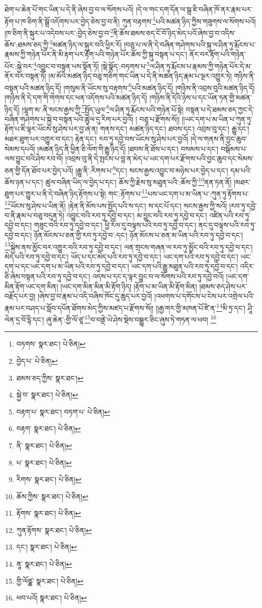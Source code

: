 ཐེག་པ་ཆེན་པོ་གང་ཡིན་པ་དེ་ནི་ཞེས་བྱ་བ་ལ་སོགས་པའོ། །དེ་ལ་གང་དག་དོན་ལ་སྒྲ་ཇི་བཞིན་ཁོ་ནར་རྣམ་པར་རྟོག་པ་ཁ་ཅིག་ནི་སྒྲོ་འདོགས་པར་བྱེད་ཅེས་བྱ་བ་ནི། ཀུན་བརྟགས་\footnote{བཏགས་  སྣར་ཐང་།  པེ་ཅིན། }པའི་མཚན་ཉིད་ཀྱིས་གཟུགས་ལ་སོགས་པའོ། །ཁ་ཅིག་ནི་སྐུར་པ་འདེབས་པར་:བྱེད་ཅེས་བྱ་བ་\footnote{བྱེད་པ་  པེ་ཅིན། }ནི་ཆོས་ཐམས་ཅད་ངོ་བོ་ཉིད་མེད་པའོ་ཞེས་བྱ་བ་འདིས་ཆོས་:ཐམས་ཅད་ཀྱི་\footnote{ཐམས་ཅད་ཀྱིས་  སྣར་ཐང་། }མཚན་ཉིད་ལ་སྐུར་བའི་ཕྱིར་རོ། །བཅུ་པ་ལ་ནི་དེ་བཞིན་གཤེགས་པའི་སྐུ་ལ་ཤིན་ཏུ་རྨོངས་པ་རྣམས་ཀྱི་གཉེན་པོར་ནི་མི་རྟག་པར་རྟོག་པའི་གཉེན་པོར་ཆོས་ཀྱི་སྐུ་བསྟན་པ་དང་། ནོར་བར་རྟོག་པའི་གཉེན་པོར་:སྐྱེ་བར་\footnote{སྐྱེ་བ་  སྣར་ཐང་།  པེ་ཅིན། }འབྱུང་བ་བསྟན་པས་སྟོན་ཏོ། །སྡེ་སྣོད་:བཏགས་པ་\footnote{བརྟག་པ་  སྣར་ཐང་། བཏག་པ་  པེ་ཅིན། }ལ་ཤིན་ཏུ་རྨོངས་པ་རྣམས་ཀྱི་གཉེན་པོར་དེ་མ་ནོར་བར་བསྟན་ཏོ། །མ་མོའི་མཚན་ཉིད་བཅུ་གཅིག་གང་ཡིན་པ་དེ་ནི་མཚན་ཉིད་རྣམ་པ་ལྔར་འགྱུར་ཏེ། གཉིས་ནི་བསྟན་པའི་མཚན་ཉིད་དོ། །གསུམ་ནི་ཡོངས་སུ་བརྟགས་\footnote{བརྟག་  སྣར་ཐང་།  པེ་ཅིན། }པའི་མཚན་ཉིད་དོ། །གཉིས་ནི་འབྲས་བུའི་མཚན་ཉིད་དོ། །གཉིས་ནི་དེ་དག་གི་གེགས་དང་ཕན་འདོགས་པའི་མཚན་ཉིད་དོ། །གཉིས་ནི་དེའི་ཉེས་པ་དང་ཡོན་ཏན་གྱི་མཚན་ཉིད་དོ། །ལྷག་མ་:ནི་སངས་རྒྱས་ཀྱི་\footnote{ནི་  སྣར་ཐང་།  པེ་ཅིན། }སྤྱོད་ཡུལ་\footnote{པ་  སྣར་ཐང་།  པེ་ཅིན། }ལ་ཤིན་ཏུ་རྨོངས་པའི་གཉེན་པོ་སྟེ། བསྟན་པ་དེ་ཐམས་ཅད་ཀྱང་དེ་བཞིན་གཤེགས་པ་སྐྱེ་བ་བསྟན་པའི་ཚུལ་དུ་རིག་པར་བྱའོ། །
བཅུ་པ་རྫོགས་སོ།། །།ཡང་དག་པ་མ་ཡིན་པ་ཀུན་ཏུ་རྟོག་པ་ཇི་ལྟར་ཡོངས་སུ་ཤེས་པར་བྱ་ཞེ་ན། གནས་དང་། མཚན་ཉིད་དང་། ཐབས་དང་། འབྲས་བུ་དང་། རྒྱུ་དང་། མཐར་ཐུག་པར་འགྱུར་བ་དང་། རྟེན་དང་། རབ་ཏུ་དབྱེ་བས་ཡོངས་སུ་ཤེས་པར་བྱའོ། །དེ་ལ་གནས་ནི་བྱང་ཆུབ་སེམས་དཔའོ། །མཚན་ཉིད་ནི་ཕྱིན་ཅི་ལོག་གི་རྒྱུ་ཉིད་དོ། །ཐབས་ནི་ཐོས་པ་དང་། བསམས་པ་དང་། བསྒོམས་པ་ལས་བྱུང་བའི་ཤེས་རབ་བོ། །འབྲས་བུ་ནི་དེ་སྤངས་པ་བླ་ན་མེད་པ་ཡང་དག་པར་རྫོགས་པའི་བྱང་ཆུབ་དང་སེམས་ཅན་གྱི་དོན་ཐོབ་པར་བྱེད་པའོ། །རྒྱུ་ནི་:རིགས་པ་\footnote{རིགས་  སྣར་ཐང་།  པེ་ཅིན། }དང་། སངས་རྒྱས་འབྱུང་བ་མཉེས་པར་བྱེད་པ་དང་། དམ་པའི་ཆོས་ཉན་པ་དང་། ཚུལ་བཞིན་ཡིད་ལ་བྱེད་པ་དང་། ཆོས་ཀྱི་རྗེས་སུ་མཐུན་པའི་:ཆོས་ཀྱི་\footnote{ཆོས་ཀྱིས་  སྣར་ཐང་།  པེ་ཅིན། }ནན་ཏན་ནོ། །མཐར་ཐུག་པར་གྱུར་པ་ནི་དེ་བཞིན་ཉིད་རྟོགས་པ་སྟེ། གང་:རྟོགས་པ་\footnote{རྟོགས་  སྣར་ཐང་།  པེ་ཅིན། }པས་ཡང་དག་པ་མ་ཡིན་པ་:ཀུན་ཏུ་རྟོགས་པ་\footnote{ཀུན་རྟོགས་  སྣར་ཐང་།  པེ་ཅིན། }ཡོངས་སུ་ཤེས་པ་ཡིན་ནོ། །རྟེན་ནི་མོས་པས་སྤྱོད་པའི་ས་དང་། ས་དང་པོ་དང་། སངས་རྒྱས་ཀྱི་སའོ། །རབ་ཏུ་དབྱེ་བ་ནི་རྣམ་པ་བཅུ་བདུན་ཏེ། འབྱུང་བའི་རབ་ཏུ་དབྱེ་བ་དང་། མ་བྱུང་བའི་རབ་ཏུ་དབྱེ་བ་དང་། འཛིན་པའི་རབ་ཏུ་དབྱེ་བ་དང་། གཟུང་བའི་རབ་ཏུ་དབྱེ་བ་དང་། ཕྱི་རོལ་དུ་བལྟས་པའི་རབ་ཏུ་དབྱེ་བ་དང་། ནང་དུ་བལྟས་པའི་རབ་ཏུ་དབྱེ་བ་དང་། ཉོན་མོངས་པ་ཅན་གྱི་རབ་ཏུ་དབྱེ་བ་:དང་། ཉོན་མོངས་པ་ཅན་མ་ཡིན་པའི་རབ་ཏུ་དབྱེ་བ་དང་། \footnote{དང་།    སྣར་ཐང་།  པེ་ཅིན། }སྐྱེས་ནས་མྱོང་བར་འགྱུར་བའི་རབ་ཏུ་དབྱེ་བ་དང་། ལན་གྲངས་གཞན་ལ་རབ་ཏུ་མྱོང་བའི་རབ་ཏུ་དབྱེ་བ་དང་། མེད་པའི་རབ་ཏུ་དབྱེ་བ་དང་། ཡོད་པ་དང་མེད་པའི་རབ་ཏུ་དབྱེ་བ་དང་། ཡང་དག་པའི་རབ་ཏུ་དབྱེ་བ་དང་། ཡང་དག་པ་དང་ཡང་དག་པ་མ་ཡིན་པའི་རབ་ཏུ་དབྱེ་བ་དང་། ཡང་དག་པའི་རྒྱུ་མཐུན་པའི་རབ་ཏུ་དབྱེ་བ་དང་། འདིར་ཅི་ཞེས་བསྟན་པའི་རབ་ཏུ་དབྱེ་བ་དང་། འདས་པ་དང་ད་ལྟར་བྱུང་བ་ལ་སོགས་པའི་རབ་ཏུ་དབྱེ་བའོ། །ཡང་དག་མིན་རྟོག་ཡང་དག་མིན། །ཡང་དག་མིན་མིན་མི་རྟོག་ཉིད། །རྟོག་པ་མ་ཡིན་མི་རྟོག་མིན། །ཐམས་ཅད་ཤེས་པར་བརྗོད་པར་བྱ། །ཞེས་བྱ་བ་རྣམ་པ་འདི་བཞིས་ཁོང་དུ་ཆུད་པར་བྱའོ། །འཕགས་པ་དགོངས་པ་ངེས་པར་འགྲེལ་པའི་རྣམ་པར་བཤད་པ་སློབ་དཔོན་ཐོགས་མེད་ཀྱིས་མཛད་པ་རྫོགས་སོ།། །།རྒྱ་གར་གྱི་མཁན་པོ་ཛི་ན་\footnote{ནཱ་  སྣར་ཐང་།  པེ་ཅིན། }མི་ཏྲ་དང་། ཤཱི་ལེན་དྲ་བོ་དྷི་དང་། ཞུ་ཆེན་:གྱི་ལོ་ཙཱ་\footnote{གྱི་ལོཙྪ་  སྣར་ཐང་།  པེ་ཅིན། }བ་བནྡེ་ཡེ་ཤེས་སྡེས་བསྒྱུར་ཅིང་ཞུས་ཏེ་གཏན་ལ་ཕབ། \footnote{ཕབ་པའོ།   སྣར་ཐང་།  པེ་ཅིན། }